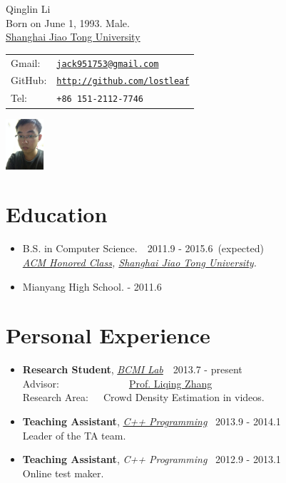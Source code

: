 \documentclass[letterpaper]{article}
\def\name{Qinglin Li}
\begin{document}
\begin{minipage}{0.4\linewidth}
  {\huge \name }
  \vspace{0.1in} \\
  Born on June 1, 1993. Male. \\
  \href{http://www.sjtu.edu.cn/}{Shanghai Jiao Tong University}
\end{minipage}
\begin{minipage}{0.45\linewidth}
  \begin{tabular}{ll}
    Gmail:  & \href{mailto:jack951753@gmail.com}{\tt jack951753@gmail.com} \\
    GitHub: & \href{https://github.com/lostleaf}{\tt http://github.com/lostleaf} \\
    Tel:    & {\tt +86 151-2112-7746}
  \end{tabular}
\end{minipage}
\begin{minipage}{0.45\linewidth}
\includegraphics[width=40pt]{photo}
\end{minipage}



\section*{Education}

\begin{itemize}

\item  B.S. in Computer Science.~\quad\qquad~2011.9 - 2015.6~(expected) \\
    \emph{\href{http://acm.sjtu.edu.cn}{ACM Honored Class},
    \href{http://www.sjtu.edu.cn/}{Shanghai Jiao Tong University}.}
\item
    Mianyang High School.\qquad\qquad{} - 2011.6
\end{itemize}

\section*{Personal Experience}
\begin{itemize}
\item \textbf{Research Student}, \emph{\href{http://bcmi.sjtu.edu.cn}{BCMI Lab}}\qquad\qquad\qquad~~2013.7 - present\\
    Advisor:~~~~~~~~~~~~~~{\href{http://bcmi.sjtu.edu.cn/~zhangliqing/}{Prof. Liqing Zhang}}\\
    Research Area:~~~Crowd Density Estimation in videos.
\item \textbf{Teaching Assistant},  \emph{\href{http://acm.sjtu.edu.cn/wiki/Programming_2013}{C++ Programming}}\qquad~ 2013.9 - 2014.1\\
Leader of the TA team.
\item \textbf{Teaching Assistant},  \emph{C++ Programming}\qquad~ 2012.9 - 2013.1\\
Online test maker.
\end{itemize}
\end{document}
